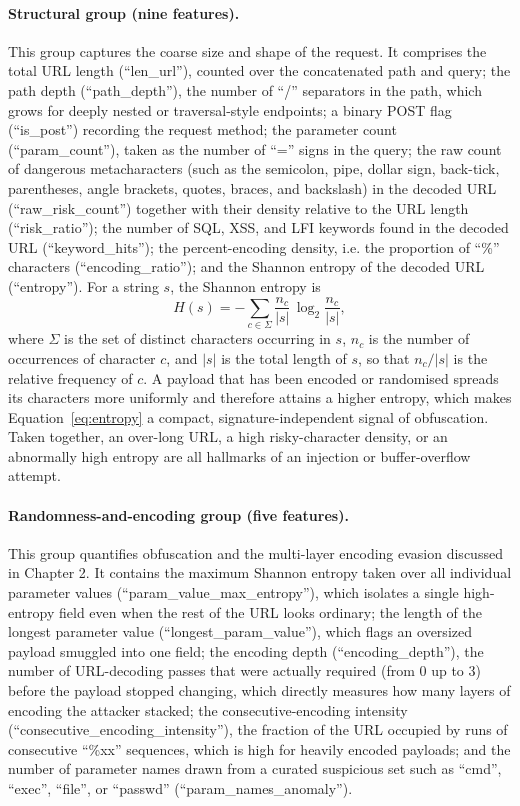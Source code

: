 \documentclass[12pt,a4paper]{report}
\begin{document}
\paragraph{Structural group (nine features).} This group captures the coarse
size and shape of the request. It comprises the total URL length
(``len\_url''), counted over the concatenated path and query; the path
depth (``path\_depth''), the number of ``/'' separators in the
path, which grows for deeply nested or traversal-style endpoints; a binary
POST flag (``is\_post'') recording the request method; the parameter
count (``param\_count''), taken as the number of ``='' signs in
the query; the raw count of dangerous metacharacters (such as the
semicolon, pipe, dollar sign, back-tick, parentheses, angle brackets,
quotes, braces, and backslash) in the decoded URL
(``raw\_risk\_count'') together with their density relative to the URL
length (``risk\_ratio''); the number of SQL, XSS, and LFI keywords found
in the decoded URL (``keyword\_hits''); the percent-encoding density,
i.e. the proportion of ``\%'' characters
(``encoding\_ratio''); and the Shannon entropy of the decoded URL
(``entropy''). For a string $s$, the Shannon entropy is
\begin{equation}
  H(s) = -\sum_{c \in \Sigma} \frac{n_c}{|s|}\,\log_2 \frac{n_c}{|s|},
  \label{eq:entropy}
\end{equation}
where $\Sigma$ is the set of distinct characters occurring in $s$, $n_c$ is
the number of occurrences of character $c$, and $|s|$ is the total length of
$s$, so that $n_c/|s|$ is the relative frequency of $c$. A payload that has
been encoded or randomised spreads its characters more uniformly and
therefore attains a higher entropy, which makes Equation~\eqref{eq:entropy} a
compact, signature-independent signal of obfuscation. Taken together, an
over-long URL, a high risky-character density, or an abnormally high entropy
are all hallmarks of an injection or buffer-overflow attempt.

\paragraph{Randomness-and-encoding group (five features).} This group
quantifies obfuscation and the multi-layer encoding evasion discussed in
Chapter 2. It contains the maximum Shannon entropy taken over all individual
parameter values (``param\_value\_max\_entropy''), which isolates a
single high-entropy field even when the rest of the URL looks ordinary; the
length of the longest parameter value (``longest\_param\_value''), which
flags an oversized payload smuggled into one field; the encoding depth
(``encoding\_depth''), the number of URL-decoding passes that were
actually required (from $0$ up to $3$) before the payload stopped changing,
which directly measures how many layers of encoding the attacker stacked; the
consecutive-encoding intensity (``consecutive\_encoding\_intensity''),
the fraction of the URL occupied by runs of consecutive ``\%xx''
sequences, which is high for heavily encoded payloads; and the number of
parameter names drawn from a curated suspicious set such as ``cmd'',
``exec'', ``file'', or ``passwd''
(``param\_names\_anomaly'').
\end{document}
